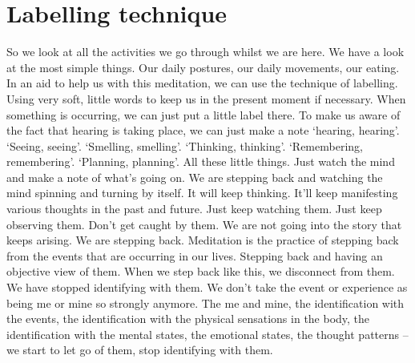 \documentclass[letterpaper,10pt,english]{sphinxmanual}
\begin{document}
\section{Labelling technique}
\label{\detokenize{1-b:labelling-technique}}
\sphinxAtStartPar
So we look at all the activities we go through whilst we are here. We
have a look at the most simple things. Our daily postures, our daily movements, our eating. In an aid to help us with this meditation, we can use the
technique of labelling. Using very soft, little words to keep us in the present
moment if necessary. When something is occurring, we can just put a little
label  there. To  make  us  aware  of  the  fact  that  hearing  is  taking  place,  we
can just make a note ‘hearing, hearing’. ‘Seeing, seeing’. ‘Smelling, smelling’. ‘Thinking, thinking’. ‘Remembering, remembering’. ‘Planning, planning’. All these little things. Just watch the mind and make a note of what’s
going on. We are stepping back and watching the mind spinning and turning
by  itself.  It  will  keep  thinking.  It’ll  keep  manifesting  various  thoughts  in
the  past  and  future.  Just  keep  watching  them.  Just  keep  observing  them.
Don’t get caught by them. We are not going into the story that keeps arising.
We are stepping back. Meditation is the practice of stepping back from the
events that are occurring in our lives. Stepping back and having an objective
view of them. When we step back like this, we disconnect from them. We
have stopped identifying with them. We don’t take the event or experience as
being me or mine so strongly anymore. The me and mine, the identification
with the events, the identification with the physical sensations in the body,
the  identification  with  the  mental  states,  the  emotional  states,  the  thought
patterns – we start to let go of them, stop identifying with them.
\end{document}
